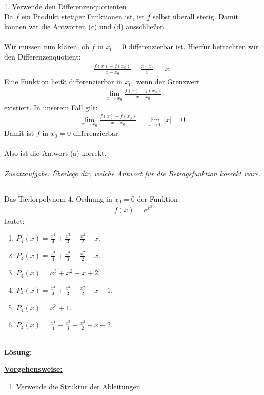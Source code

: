 \underline{1. Verwende den Differenzenquotienten}\\
Da $ f $ ein Produkt stetiger Funktionen ist, ist $ f $ selbst überall stetig.
Damit können wir die Antworten (c) und (d) ausschließen.\\
\\
Wir müssen nun klären, ob $ f $ in $ x_0 = 0 $ differenzierbar ist. Hierfür betrachten wir den Differenzenquotient:
\begin{align*}
	\frac{f(x) - f(x_0)}{x - x_0 } = \frac{x \cdot |x|}{x} = |x|.
\end{align*}
Eine Funktion heißt differenzierbar in $ x_0 $, wenn der Grenzwert
\begin{align*}
	\lim \limits_{x \to x_0} \frac{f(x) - f(x_0)}{x - x_0 }
\end{align*}
existiert. In unserem Fall gilt:
\begin{align*}
	\lim \limits_{x \to x_0} \frac{f(x) - f(x_0)}{x - x_0 }
	=
	\lim \limits_{x \to 0} |x| = 0.
\end{align*}
Damit ist $ f  $ in $ x_0 = 0 $ differenzierbar.\\
\\
Also ist die Antwort (a) korrekt.\\
\\
\textit{Zusatzaufgabe: Überlege dir, welche Antwort für die Betragsfunktion korrekt wäre.}
\newpage
\subsection*{}
Das Taylorpolynom $ 4 $. Ordnung in $ x_0 = 0 $ der Funktion
\begin{align*}
	f(x) = e^{x^3}
\end{align*}
lautet:
\renewcommand{\labelenumi}{(\alph{enumi})}
\begin{enumerate}
	\item 
	$ P_4(x) = \frac{x^4}{4} + \frac{x^3}{3} + \frac{x^2}{2} + x $. 
	\item
	$ P_4(x) = \frac{x^4}{4} + \frac{x^3}{3} + \frac{x^2}{2} - x $. 
	\item
	$ P_4(x) = x^3 + x^2 + x + 2$. 
	\item
	$ P_4(x) = \frac{x^4}{4} + \frac{x^3}{3} + \frac{x^2}{2} + x +1 $. 
	\item
	$ P_4(x) = x^3 + 1$. 
	\item
	$ P_4(x) = \frac{x^4}{4} - \frac{x^3}{3} + \frac{x^2}{2} - x + 2 $. 
\end{enumerate}
\ \\
\textbf{Lösung:}
\begin{mdframed}
	\underline{\textbf{Vorgehensweise:}}
	\renewcommand{\labelenumi}{\theenumi.}
	\begin{enumerate}
		\item Verwende die Struktur der Ableitungen.
	\end{enumerate}
\end{mdframed}


